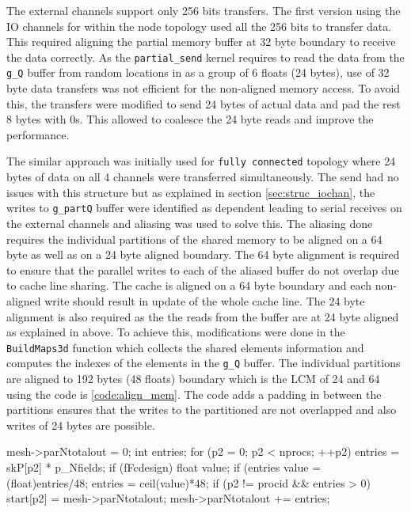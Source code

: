 The external channels support only 256 bits transfers. The first version
using the IO channels for within the node topology used all the 256 bits
to transfer data. This required aligning the partial memory buffer
at 32 byte boundary to receive the data correctly. As the \texttt{partial\_send}
kernel requires to read the data from the \texttt{g\_Q} buffer from random
locations in as a group of 6 floats (24 bytes), use of 32 byte data transfers
was not efficient for the non-aligned memory access. To avoid this, the transfers
were modified to send 24 bytes of actual data and pad the rest 8 bytes with 0s.
This allowed to coalesce the 24 byte reads and improve the performance.

The similar approach was initially used for \texttt{fully connected} topology where
24 bytes of data on all 4 channels were transferred simultaneously. The send had
no issues with this structure but as explained in section \ref{sec:struc_iochan},
the writes to \texttt{g\_partQ} buffer were identified as dependent leading
to serial receives on the external channels and aliasing was used to solve this.
The aliasing done requires the individual partitions of the shared memory to be aligned
on a 64 byte as well as on a 24 byte aligned boundary. The 64 byte alignment is required
to ensure that the parallel writes to each of the aliased buffer do not overlap due to
cache line sharing. The cache is aligned on a 64 byte boundary and each non-aligned
write should result in update of the whole cache line. The 24 byte alignment is also
required as the the reads from the buffer are at 24 byte aligned as explained in above.
To achieve this, modifications
were done in the \texttt{BuildMaps3d} function which collects the shared elements information
and computes the indexes of the elements in the \texttt{g\_Q} buffer. The individual partitions
are aligned to 192 bytes (48 floats) boundary which is the \ac{LCM} of 24 and 64 using the code
is \ref{code:align_mem}. The code adds a padding in between the partitions ensures
that the writes to the partitioned are not overlapped and also writes of 24 bytes are
possible.

\begin{CppCode}[caption=Alignment code introduced to ensure non-overlap writes of the
    aliased buffers, frame=tlrb, label=code:align_mem, float]
mesh->parNtotalout = 0;
int entries;
for (p2 = 0; p2 < nprocs; ++p2)
{
    entries = skP[p2] * p_Nfields;
    if (fFcdesign)
    {
        float value;
        if (entries%
        {
            value = (float)entries/48;
            entries = ceil(value)*48;
        }
        if (p2 != procid && entries > 0)
            start[p2] = mesh->parNtotalout;
    }
    mesh->parNtotalout += entries;
}
\end{CppCode}


